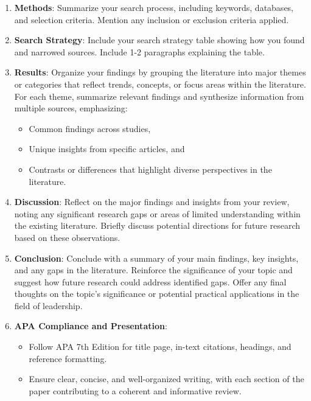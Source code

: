 \documentclass[
  letterpaper,
  DIV=11,
  numbers=noendperiod]{scrreprt}
\providecommand{\tightlist}{%
  \setlength{\itemsep}{0pt}\setlength{\parskip}{0pt}}\usepackage{longtable,booktabs,array}
\begin{document}
\begin{enumerate}
\def\labelenumi{\arabic{enumi}.}
\tightlist
\item
  \textbf{Methods}: Summarize your search process, including keywords,
  databases, and selection criteria. Mention any inclusion or exclusion
  criteria applied.
\item
  \textbf{Search Strategy}: Include your search strategy table showing
  how you found and narrowed sources. Include 1-2 paragraphs explaining
  the table.
\item
  \textbf{Results}: Organize your findings by grouping the literature
  into major themes or categories that reflect trends, concepts, or
  focus areas within the literature. For each theme, summarize relevant
  findings and synthesize information from multiple sources,
  emphasizing:

  \begin{itemize}
  \tightlist
  \item
    Common findings across studies,
  \item
    Unique insights from specific articles, and
  \item
    Contrasts or differences that highlight diverse perspectives in the
    literature.
  \end{itemize}
\item
  \textbf{Discussion}: Reflect on the major findings and insights from
  your review, noting any significant research gaps or areas of limited
  understanding within the existing literature. Briefly discuss
  potential directions for future research based on these observations.
\item
  \textbf{Conclusion}: Conclude with a summary of your main findings,
  key insights, and any gaps in the literature. Reinforce the
  significance of your topic and suggest how future research could
  address identified gaps. Offer any final thoughts on the topic's
  significance or potential practical applications in the field of
  leadership.
\item
  \textbf{APA Compliance and Presentation}:

  \begin{itemize}
  \tightlist
  \item
    Follow APA 7th Edition for title page, in-text citations, headings,
    and reference formatting.
  \item
    Ensure clear, concise, and well-organized writing, with each section
    of the paper contributing to a coherent and informative review.
  \end{itemize}
\end{enumerate}
\end{document}
